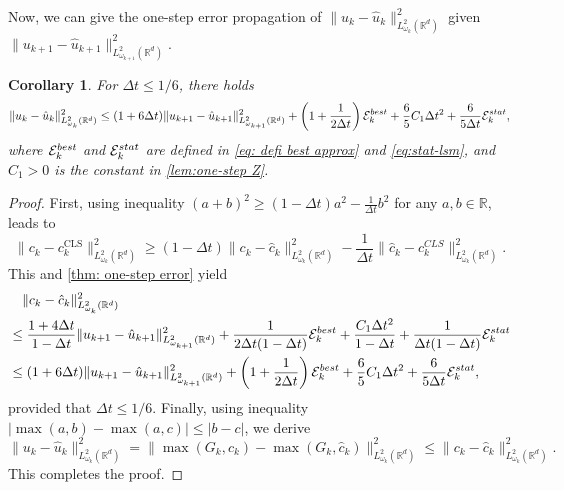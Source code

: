 \documentclass[10pt,a4paper]{amsart}
\numberwithin{equation}{section}
\numberwithin{algorithm}{section}
\theoremstyle{plain}
\newtheorem{corollary}[corollary]{Corollary}
\theoremstyle{remark}
\newcommand{\op}{\operatorname}
\newcommand{\R}{\mathbb{R}}
\begin{document}
Now, we can give the one-step error propagation of $\|u_k - \hat{u}_k\|_{{L}^2_{\omega_k}(\R^d)}^2$ given $\|u_{k+1} - \hat{u}_{k+1}\|_{{L}^2_{\omega_{k+1}}(\R^d)}^2$.
\begin{corollary} \label{cor: one-step error}
For $\Delta t\le 1/6$, there holds
    \begin{equation*}
        \|u_k - \hat{u}_k\|_{{L}^2_{\omega_k}(\R^d)}^2 \le (1+6 \Delta t) \|u_{k+1} - \hat{u}_{k+1}\|_{{L}^2_{\omega_{k+1}}(\R^d)}^2 + \left(1 + \frac{1}{2\Delta t}\right) \mathcal{E}_k^{\rm best} + \frac{6}{5}C_1\Delta t^2 + \frac{6}{5\Delta t} \mathcal{E}_k^{\rm stat},
    \end{equation*}
    where $\mathcal{E}_k^{\rm best}$ and $\mathcal{E}_k^{\rm stat}$ are defined in \cref{eq: defi best approx} and \cref{eq:stat-lsm}, and $C_1>0$ is the constant in \cref{lem:one-step Z}.
\end{corollary}
\begin{proof}
First, using inequality $(a+b)^2 \ge (1-\Delta t)a^2 - \frac{1}{\Delta t}b^2$ for any $a,b\in\mathbb{R}$, leads to
\begin{equation*}
    \|c_k - c_k^{\op{CLS}}\|_{{L}^2_{\omega_k}(\R^d)}^2 \ge (1-\Delta t) \|c_k - \hat{c}_k\|_{{L}^2_{\omega_k}(\R^d)}^2 - \frac{1}{\Delta t}\|\hat{c}_k - c_k^{CLS}\|_{{L}^2_{\omega_k}(\R^d)}^2.
\end{equation*}
This and \cref{thm: one-step error} yield
\begin{align*}
    &\quad \|c_k - \hat{c}_k\|_{{L}^2_{\omega_k}(\R^d)}^2 \\
    &\le \frac{1+4\Delta t}{1-\Delta t} \|u_{k+1} - \hat{u}_{k+1}\|_{{L}^2_{\omega_{k+1}}(\R^d)}^2 + \frac{1}{2\Delta t(1-\Delta t)} \mathcal{E}_k^{\rm best} + \frac{C_1\Delta t^2}{1-\Delta t} + \frac{1}{\Delta t(1-\Delta t)} \mathcal{E}_k^{\rm stat} \\
    &\le (1 + 6\Delta t) \|u_{k+1} - \hat{u}_{k+1}\|_{{L}^2_{\omega_{k+1}}(\R^d)}^2 + \left(1 + \frac{1}{2\Delta t} \right) \mathcal{E}_k^{\rm best} + \frac{6}{5}C_1\Delta t^2 + \frac{6}{5\Delta t} \mathcal{E}_k^{\rm stat},
\end{align*}
provided that $\Delta t\le 1/6$.
Finally, using inequality $|\max(a,b) - \max(a,c)| \le |b-c|$, we derive
\begin{equation*}
    \|u_k - \hat{u}_k\|_{{L}^2_{\omega_k}(\R^d)}^2 = \|\max(G_k, c_k) - \max(G_k, \hat{c}_k)\|_{{L}^2_{\omega_k}(\R^d)}^2 \le \|c_k - \hat{c}_k\|_{{L}^2_{\omega_k}(\R^d)}^2.
\end{equation*}
This completes the proof.
\end{proof}
\end{document}

